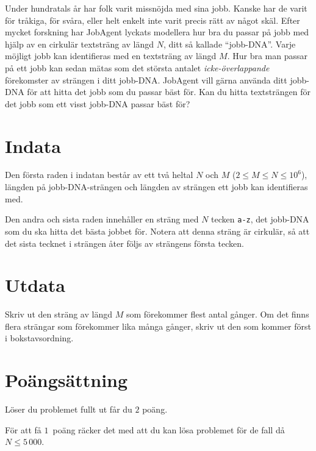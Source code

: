 Under hundratals år har folk varit missnöjda med sina jobb.
Kanske har de varit för tråkiga, för svåra, eller helt enkelt inte varit precis rätt av något skäl.
Efter mycket forskning har JobAgent lyckats modellera hur bra du passar på jobb med hjälp av en cirkulär textsträng av längd $N$, ditt så kallade ``jobb-DNA''.
Varje möjligt jobb kan identifieras med en textsträng av längd $M$.
Hur bra man passar på ett jobb kan sedan mätas som det största antalet \emph{icke-överlappande} förekomster av strängen i ditt jobb-DNA.
JobAgent vill gärna använda ditt jobb-DNA för att hitta det jobb som du passar bäst för.
Kan du hitta textsträngen för det jobb som ett visst jobb-DNA passar bäst för?

\section*{Indata}
Den första raden i indatan består av ett två heltal $N$ och $M$ ($2 \le M \le N \le 10^6$), längden på jobb-DNA-strängen och längden av strängen ett jobb kan identifieras med.

Den andra och sista raden innehåller en sträng med $N$ tecken \texttt{a-z}, det jobb-DNA som du ska hitta det bästa jobbet för.
Notera att denna sträng är cirkulär, så att det sista tecknet i strängen åter följs av strängens första tecken.

\section*{Utdata}
Skriv ut den sträng av längd $M$ som förekommer flest antal gånger.
Om det finns flera strängar som förekommer lika många gånger, skriv ut den som kommer först i bokstavsordning.

\section*{Poängsättning}
Löser du problemet fullt ut får du $2$ poäng.

För att få $1$ poäng räcker det med att du kan lösa problemet för de fall då $N \le 5\,000$.
